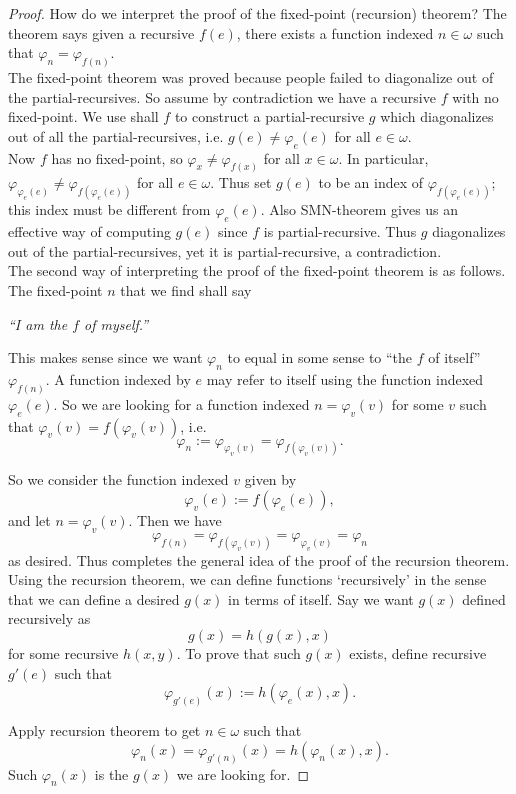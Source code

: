 \documentclass{article}
\begin{document}
    \begin{proof}
      How do we interpret the proof of the fixed-point (recursion) theorem?
      The theorem says given a recursive $f(e)$, there exists a function
      indexed $n\in\omega$ such that $\varphi_n=\varphi_{f(n)}$.\\

      The fixed-point theorem was proved because people failed to
      diagonalize out of the partial-recursives. So assume by contradiction
      we have a recursive $f$ with no fixed-point. We use shall $f$ to
      construct a partial-recursive $g$ which diagonalizes out of all the
      partial-recursives, i.e. $g(e)\neq\varphi_e(e)$ for all
      $e\in\omega$.\\

      Now $f$ has no fixed-point, so $\varphi_x\neq\varphi_{f(x)}$ for all
      $x\in\omega$. In particular, $\varphi_{\varphi_e(e)} \neq
      \varphi_{f(\varphi_e(e))}$ for all $e\in\omega$. Thus set $g(e)$ to
      be an index of $\varphi_{f(\varphi_e(e))}$; this index must be
      different from $\varphi_e(e)$. Also SMN-theorem gives us an effective
      way of computing $g(e)$ since $f$ is partial-recursive. Thus $g$
      diagonalizes out of the partial-recursives, yet it is
      partial-recursive, a contradiction.\\

      The second way of interpreting the proof of the fixed-point theorem
      is as follows. The fixed-point $n$ that we find shall say
      \begin{center}
        \textit{``I am the $f$ of myself.''}
      \end{center}

      This makes sense since we want $\varphi_n$ to equal in some sense to
      ``the $f$ of itself'' $\varphi_{f(n)}$. A function indexed by $e$ may
      refer to itself using the function indexed $\varphi_e(e)$. So we are
      looking for a function indexed $n=\varphi_v(v)$ for some $v$ such
      that
      $\varphi_v(v)=f(\varphi_v(v))$, i.e.
      \[\varphi_n :=\varphi_{\varphi_v(v)} =\varphi_{f(\varphi_v(v))}.\]

      So we consider the function indexed $v$ given by
      \[\varphi_v(e) :=f(\varphi_e(e)),\]
      and let $n=\varphi_v(v)$. Then we have
      \[\varphi_{f(n)} =\varphi_{f(\varphi_v(v))} =\varphi_{\varphi_v(v)}
      =\varphi_n\]
      as desired. Thus completes the general idea of the proof of the
      recursion theorem. \\

      Using the recursion theorem, we can define functions `recursively' in
      the sense that we can define a desired $g(x)$ in terms of itself. Say
      we want $g(x)$ defined recursively as
      \[g(x)=h(g(x),x)\]
      for some recursive $h(x,y)$. To prove that such $g(x)$ exists,
      define recursive $g'(e)$ such that
      \[\varphi_{g'(e)}(x) :=h(\varphi_e(x),x).\]

      Apply recursion theorem to get $n\in\omega$ such that
      \[\varphi_n(x) =\varphi_{g'(n)}(x) =h(\varphi_n(x),x).\]
      Such $\varphi_n(x)$ is the $g(x)$ we are looking for.
    \end{proof}
\end{document}
